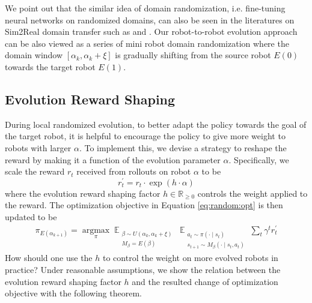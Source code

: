 \documentclass[nohyperref]{article}
\theoremstyle{plain}
\theoremstyle{definition}
\theoremstyle{remark}
\begin{document}
We point out that the similar idea of domain randomization, i.e. fine-tuning neural networks 
on randomized domains, can also be seen in the literatures on Sim2Real domain transfer such as \cite{domain:randomization} and \cite{cad2rl}.
Our robot-to-robot evolution approach can be also viewed as a series of mini robot domain randomization where the domain window $[\alpha_k, \alpha_k + \xi]$ is gradually shifting from the source robot $E(0)$ towards the target robot $E(1)$.



\subsection{Evolution Reward Shaping}\label{sec:reward:shaping}

During local randomized evolution, to better adapt the policy towards the goal of the target robot, it is helpful to encourage the policy to give more weight to robots with larger $\alpha$. 
To implement this, we devise a strategy to reshape the reward by making it a function of the evolution parameter $\alpha$. 
Specifically, we scale the reward $r_t$ received from rollouts on robot $\alpha$ to be
\begin{equation} \label{eq:local:reward:shaping}
    r_t^\prime =
    r_t \cdot \exp(h \cdot \alpha)
\end{equation}
where the evolution reward shaping factor $h\in \mathbb{R}_{\ge 0}$ controls the weight applied to the reward.
The optimization objective in Equation \eqref{eq:random:opt} is then updated to be
\begin{equation} \label{eq:local:reward:opt}
\begin{split}
    \pi_{E(\alpha_{k+1})} = 
    \mathop{\arg \max}\limits_{\pi}
    \mathop{\mathbb{E}}_{ 
    \substack{
    \beta \sim U(\alpha_k, \alpha_k+\xi) \\
    M_\beta = E(\beta)
    }}
    \mathop{\mathbb{E}}_{ 
    \substack{a_t \sim \pi(\cdot \mid s_t) \\ 
    s_{t+1} \sim M_\beta(\cdot \mid s_t, a_t)}}
    \sum_{t} \gamma^t r_t^\prime 
\end{split}
\end{equation}
How should one use the $h$ to control the weight on more evolved robots in practice? 
Under reasonable assumptions, we show the relation between the evolution reward shaping factor $h$ and the resulted change of optimization objective with the following theorem.


\end{document}
